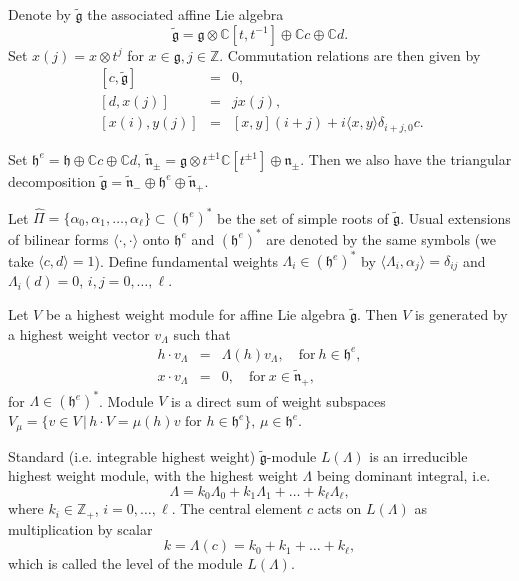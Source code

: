 \documentclass[a4paper, 10pt,oneside]{amsart}
\begin{document}
Denote by ${\tilde{{\mathfrak g}}}$ the associated affine Lie algebra
$${\tilde{{\mathfrak g}}}={{\mathfrak g}}\otimes {{\mathbb C}}[t,t^{-1}]\oplus {{\mathbb C}} c \oplus {{\mathbb C}} d.$$
Set $x(j)=x\otimes t^j$ for $x\in{{\mathfrak g}},j\in{{\mathbb Z}}$. Commutation relations
are then given by
\begin{eqnarray*}
\ [c,{\tilde{{\mathfrak g}}}] & = & 0, \\
\ [d,x(j)] & = & j x(j), \\
\ [x(i),y(j)] & = & [x,y](i+j)+ i\langle x,y\rangle \delta_{i+j,0}c.
\end{eqnarray*}

Set ${{\mathfrak h}^e}={{\mathfrak h}}\oplus{{\mathbb C}} c \oplus{{\mathbb C}} d,\, {\tilde{{\mathfrak n}}}_\pm={{\mathfrak g}}\otimes t^{\pm 1}{{\mathbb C}}
[t^{\pm 1}]\oplus {{\mathfrak n}}_\pm$. Then we also have the triangular
decomposition ${\tilde{{\mathfrak g}}}={\tilde{{\mathfrak n}}}_-\oplus{{\mathfrak h}^e}\oplus{\tilde{{\mathfrak n}}}_+$.

Let $\hat{\Pi}=\{\alpha_0,\alpha_1,\dots,\alpha_\ell\}\subset
({{\mathfrak h}^e})^*$ be the set of simple roots of ${\tilde{{\mathfrak g}}}$. Usual extensions of bilinear
forms $\langle\cdot,\cdot\rangle$ onto ${{\mathfrak h}^e}$ and $({{\mathfrak h}^e})^*$ are
denoted by the same symbols (we take $\langle c,d \rangle=1$).
Define fundamental weights $\Lambda_i\in ({{\mathfrak h}^e})^*$ by $\langle
\Lambda_i,\alpha_j \rangle=\delta_{ij}$ and $\Lambda_i(d)=0$,
$i,j=0,\dots,\ell$.

Let $V$ be a highest weight module for affine Lie algebra ${\tilde{{\mathfrak g}}}$.
Then $V$ is generated by a highest weight vector $v_\Lambda$ such
that
\begin{eqnarray*}
h\cdot v_\Lambda & = & \Lambda(h) v_\Lambda,\quad\textrm{for}\ h\in{{\mathfrak h}^e}, \\
x\cdot v_\Lambda & = & 0,\quad\textrm{for}\ x\in{\tilde{{\mathfrak n}}}_+,
\end{eqnarray*}
for $\Lambda\in ({{\mathfrak h}^e})^*$. Module $V$ is a direct sum of weight
subspaces $V_\mu=\{v\in V \,|\,h\cdot V =\mu(h) v \textrm{ for }
h\in{{\mathfrak h}^e}\},\,\mu\in{{\mathfrak h}^e}$.

Standard (i.e. integrable highest weight) ${\tilde{{\mathfrak g}}}$-module $L(\Lambda)$
is an irreducible highest weight module, with the highest weight
$\Lambda$ being dominant integral, i.e.
$$\Lambda=k_0 \Lambda_0+k_1 \Lambda_1+\dots+k_\ell \Lambda_\ell,$$
where $k_i\in{{\mathbb Z}}_+$, $i=0,\dots,\ell$. The central element $c$ acts on
$L(\Lambda)$ as multiplication by scalar
$$k=\Lambda(c)=k_0+k_1+\dots+k_\ell,$$
which is called the level of the module $L(\Lambda)$.
\end{document}
